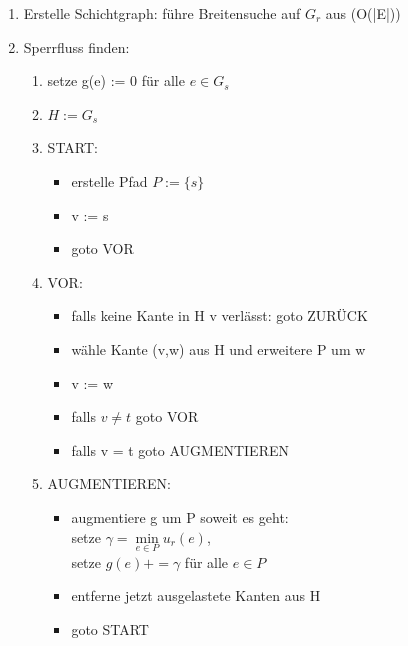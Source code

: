 \documentclass[10pt,a4paper]{article}
\begin{document}
\begin{enumerate}[label={\alph*)}]
        \item Erstelle Schichtgraph:
            führe Breitensuche auf $G_r$ aus (O(|E|))
        \item Sperrfluss finden:
            \begin{enumerate}[label={\arabic*.}]
                \item setze g(e) := 0 für alle $e \in G_s$
                \item $H := G_s$
                \item START: \\
                    \begin{itemize}
                        \item erstelle Pfad $P := \{s\}$
                        \item v := s
                        \item goto VOR
                    \end{itemize}
                \item VOR: \\
                    \begin{itemize}
                        \item falls keine Kante in H v verlässt: goto ZURÜCK
                        \item wähle Kante (v,w) aus H und erweitere P um w
                        \item v := w
                        \item falls $v \neq t$ goto VOR
                        \item falls v = t goto AUGMENTIEREN
                    \end{itemize}
                \item AUGMENTIEREN: \\
                    \begin{itemize}
                        \item augmentiere g um P soweit es geht:\\
                            setze $\gamma = \min\limits_{e\in P} u_r(e)$,\\
                            setze $g(e) += \gamma$ für alle $ e \in P$
                        \item entferne jetzt ausgelastete Kanten aus H
                        \item goto START
                    \end{itemize}


\end{enumerate}
\end{enumerate}
\end{document}
